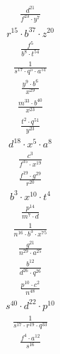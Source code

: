 \begin{align}
\frac{d^{21}}{f^{23}\cdot y^{7}}
\end{align}
\begin{align}
r^{15}\cdot b^{37}\cdot z^{20}
\end{align}
\begin{align}
\frac{f^{5}}{b^{8}\cdot t^{54}}
\end{align}
\begin{align}
\frac{1}{s^{17}\cdot q^{5}\cdot a^{51}}
\end{align}
\begin{align}
\frac{y^{9}\cdot b^{6}}{x^{29}}
\end{align}
\begin{align}
\frac{m^{33}\cdot b^{40}}{x^{23}}
\end{align}
\begin{align}
\frac{t^{2}\cdot q^{51}}{y^{23}}
\end{align}
\begin{align}
d^{18}\cdot x^{5}\cdot a^{8}
\end{align}
\begin{align}
\frac{c^{3}}{f^{35}\cdot x^{19}}
\end{align}
\begin{align}
\frac{f^{19}\cdot g^{29}}{r^{20}}
\end{align}
\begin{align}
b^{3}\cdot x^{10}\cdot t^{4}
\end{align}
\begin{align}
\frac{p^{14}}{m^{7}\cdot d}
\end{align}
\begin{align}
\frac{1}{n^{16}\cdot b^{3}\cdot x^{75}}
\end{align}
\begin{align}
\frac{g^{21}}{n^{29}\cdot a^{25}}
\end{align}
\begin{align}
\frac{b^{12}}{d^{26}\cdot q^{26}}
\end{align}
\begin{align}
\frac{p^{10}\cdot c^{2}}{n^{48}}
\end{align}
\begin{align}
s^{40}\cdot d^{22}\cdot p^{10}
\end{align}
\begin{align}
\frac{1}{s^{17}\cdot r^{19}\cdot q^{33}}
\end{align}
\begin{align}
\frac{f^{4}\cdot a^{12}}{s^{16}}
\end{align}
